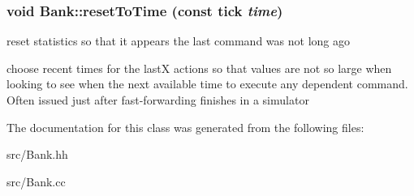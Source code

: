 \subsubsection[{resetToTime}]{\setlength{\rightskip}{0pt plus 5cm}void Bank::resetToTime (const tick {\em time})}\label{class_d_r_a_msim_i_i_1_1_bank_a79b5b7f7e8541bea8742f5cb7d8045db}


reset statistics so that it appears the last command was not long ago 

choose recent times for the lastX actions so that values are not so large when looking to see when the next available time to execute any dependent command. Often issued just after fast-\/forwarding finishes in a simulator 

The documentation for this class was generated from the following files:\begin{DoxyCompactItemize}
\item 
src/Bank.hh\item 
src/Bank.cc\end{DoxyCompactItemize}
